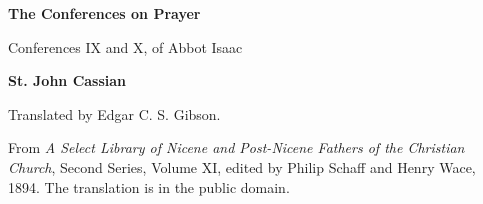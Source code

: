 \documentclass[11pt,letterpaper]{article}
\begin{document}
\color{ink}

\begin{titlepage}
\centering
\vspace*{4em}
{\LARGE\bfseries\color{heading} The Conferences on Prayer\par}
\vspace{1em}
{\large Conferences IX and X, of Abbot Isaac\par}
\vspace{2em}
{\LARGE\bfseries\color{heading} St. John Cassian\par}
\vspace{3em}
{Translated by Edgar C. S. Gibson.\par}
\vfill
{\small From \emph{A Select Library of Nicene and Post-Nicene Fathers of the
Christian Church}, Second Series, Volume XI, edited by Philip Schaff and
Henry Wace, 1894. The translation is in the public domain.\par}
\vspace{2em}
\end{titlepage}

\tableofcontents
\clearpage


\end{document}
